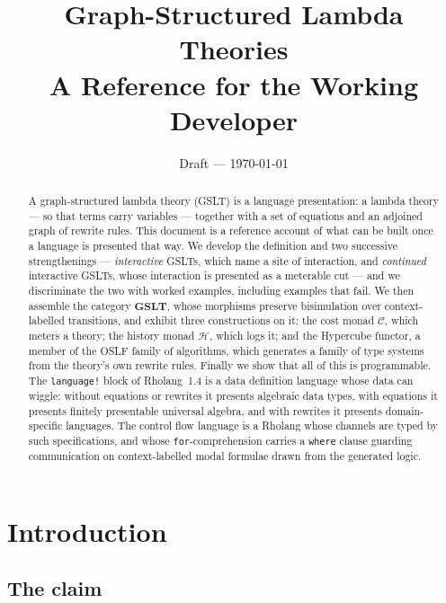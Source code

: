 \documentclass[11pt]{article}
\title{\bf Graph-Structured Lambda Theories\\[2mm]
\large A Reference for the Working Developer}
\author{}
\date{Draft --- \today}
\theoremstyle{definition}
\theoremstyle{plain}
\theoremstyle{remark}
\newcommand{\GSLT}{\mathbf{GSLT}}
\newcommand{\cost}{\mathcal{C}}
\newcommand{\hist}{\mathcal{H}}
\begin{document}
\maketitle

\begin{abstract}
A graph-structured lambda theory (GSLT) is a language presentation: a lambda theory ---
so that terms carry variables --- together with a set of equations and an adjoined graph
of rewrite rules. This document is a
reference account of what can be built once a language is presented that way. We
develop the definition and two successive strengthenings --- \emph{interactive} GSLTs,
which name a site of interaction, and \emph{continued} interactive GSLTs, whose
interaction is presented as a meterable cut --- and we discriminate the two with
worked examples, including examples that fail. We then assemble the category $\GSLT$,
whose morphisms preserve bisimulation over context-labelled transitions, and exhibit
three constructions on it: the cost monad $\cost$, which meters a theory; the history
monad $\hist$, which logs it; and the Hypercube functor, a member of the OSLF family of
algorithms, which generates a family of type systems from the theory's own rewrite
rules. Finally we show that all of this is programmable. The \texttt{language!} block of
Rholang~1.4 is a data definition language whose data can wiggle: without equations or
rewrites it presents algebraic data types, with equations it presents finitely
presentable universal algebra, and with rewrites it presents domain-specific languages.
The control flow language is a Rholang whose channels are typed by such specifications,
and whose \texttt{for}-comprehension carries a \texttt{where} clause guarding
communication on context-labelled modal formulae drawn from the generated logic.
\end{abstract}

\tableofcontents

\clearpage

\section{Introduction}

\subsection{The claim}
\end{document}
